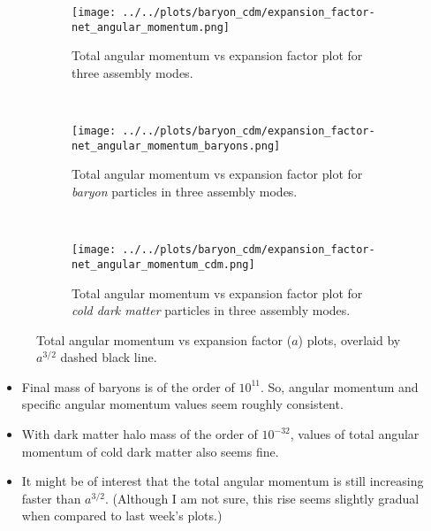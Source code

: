 \documentclass{article}
\begin{document}
	\clearpage

	\begin{figure} [h!]
		\centering
		\begin{subfigure} {\columnwidth}
				\centering 
				\texttt{[image: ../../plots/baryon\_cdm/expansion\_factor-net\_angular\_momentum.png]}
				\caption{Total angular momentum vs expansion factor plot for three assembly modes.}
		\end{subfigure} \\
			\vspace{1cm}
		\begin{subfigure} {\columnwidth}
				\centering 
				\texttt{[image: ../../plots/baryon\_cdm/expansion\_factor-net\_angular\_momentum\_baryons.png]}
				\caption{Total angular momentum vs expansion factor plot for \emph{baryon }particles in three assembly modes.}
		\end{subfigure} \\
			\vspace{1cm}
		\begin{subfigure} {\columnwidth}
				\centering 
				\texttt{[image: ../../plots/baryon\_cdm/expansion\_factor-net\_angular\_momentum\_cdm.png]}
				\caption{Total angular momentum vs expansion factor plot for \emph{cold dark matter} particles in three assembly modes.}
		\end{subfigure}
		\caption{Total angular momentum vs expansion factor (\(a\)) plots, overlaid by \(a^{3/2}\) dashed black line.}
	\end{figure}

	\Large 
	\begin{itemize}
		\item Final mass of baryons is of the order of \(10^{11}\). So, angular momentum and specific angular momentum values seem roughly consistent.
		\item With dark matter halo mass of the order of \(10^{-32}\), values of total angular momentum of cold dark matter also seems fine.
		\item It might be of interest that the total angular momentum is still increasing faster than \(a^{3/2}\). (Although I am not sure, this rise seems slightly gradual when compared to last week's plots.)
	\end{itemize} 

	\clearpage 
\end{document}
